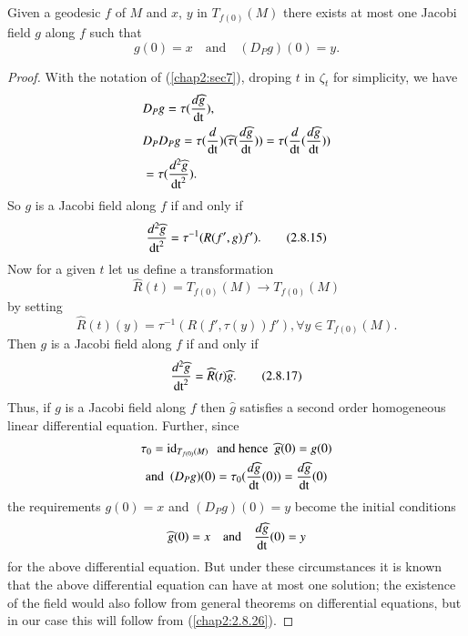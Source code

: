 \setcounter{subsection}{13}

\subsection{}\label{chap2:2.8.14}

\begin{lemma*}
Given a geodesic $f$ of $M$ and $x$, $y$ in $T_{f(0)}(M)$ there exists
at most one Jacobi field $g$ along $f$ such that
$$
g(0)=x\quad\text{and}\quad (D_{P}g)(0)=y.
$$
\end{lemma*}

\begin{proof}
With the notation of (\ref{chap2:sec7}), droping $t$ in $\zeta_{t}$ for
simplicity, we have
\begin{align*}
& D_{P}g=\tau(\frac{d\widehat{g}}{\operatorname{dt}}),\\
&
  D_{P}D_{P}g=\tau(\frac{d}{\operatorname{dt}})(\widehat{\tau}(\frac{d\widehat{g}}{\operatorname{dt}}))=\tau(\frac{d}{\operatorname{dt}}(\frac{d\widehat{g}}{\operatorname{dt}}))\\
&= \tau(\frac{d^{2}\widehat{g}}{\operatorname{dt}^{2}}).
\end{align*}
So \pageoriginale $g$ is a Jacobi field along $f$ if and only if
\begin{equation*}
\frac{d^{2}\widehat{g}}{\operatorname{dt}^{2}}=\tau^{-1}(R(f',g)f').\tag{2.8.15}\label{chap2:2.8.15} 
\end{equation*}
Now for a given $t$ let us define a transformation
$$
\widehat{R}(t)=T_{f(0)}(M)\to T_{f(0)}(M)
$$
by setting
\begin{equation*}
\widehat{R}(t)(y)=\tau^{-1}(R(f',\tau(y))f'),\forall y\in
T_{f(0)}(M).\tag{2.8.16}\label{chap2:2.8.16} 
\end{equation*}
Then $g$ is a Jacobi field along $f$ if and only if
\begin{equation*}
\frac{d^{2}\widehat{g}}{\operatorname{dt}^{2}}=\widehat{R}(t)\widehat{g}.\tag{2.8.17}\label{chap2:2.8.17}  
\end{equation*}
Thus, if $g$ is a Jacobi field along $f$ then $\widehat{g}$ satisfies
a second order homogeneous linear differential equation. Further,
since
\begin{gather*}
\tau_{0}=\operatorname{id}_{T_{f(0)}(M)}\text{ \  and hence \ }\widehat{g}(0)=g(0)\\
\text{and \ }
(D_{P}g)(0)=\tau_{0}(\frac{d\widehat{g}}{\operatorname{dt}}(0))=\frac{d\widehat{g}}{\operatorname{dt}}(0) 
\end{gather*}
the requirements $g(0)=x$ and $(D_{P}g)(0)=y$ become the initial
conditions
$$
\widehat{g}(0)=x\quad\text{and}\quad \frac{d\widehat{g}}{\operatorname{dt}}(0)=y
$$
for the above differential equation. But under these circumstances it
is known that the above differential equation can have at most one
solution; the existence of the field would also follow from general
theorems on differential equations, but in our case this will follow
from (\ref{chap2:2.8.26}).
\end{proof}

